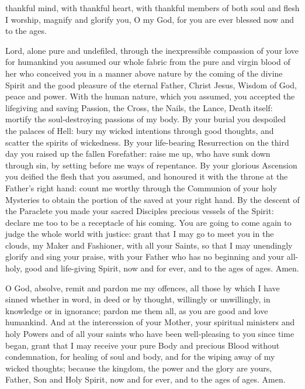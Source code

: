 thankful mind, with thankful heart, with thankful members of both soul and flesh I worship, magnify and glorify you, O my God, for you are ever blessed now and to the ages.


Lord, alone pure and undefiled, through the inexpressible compassion of your love for humankind you assumed our whole fabric from the pure and virgin blood of her who conceived you in a manner above nature by the coming of the divine Spirit and the good pleasure of the eternal Father, Christ Jesus, Wisdom of God, peace and power. With the human nature, which you assumed, you accepted the lifegiving and saving Passion, the Cross, the Nails, the Lance, Death itself: mortify the soul-destroying passions of my body. By your burial you despoiled the palaces of Hell: bury my wicked intentions through good thoughts, and scatter the spirits of wickedness. By your life-bearing Resurrection on the third day you raised up the fallen Forefather: raise me up, who have sunk down through sin, by setting before me ways of repentance. By your glorious Ascension you deified the flesh that you assumed, and honoured it with the throne at the Father's right hand: count me worthy through the Communion of your holy Mysteries to obtain the portion of the saved at your right hand. By the descent of the Paraclete you made your sacred Disciples precious vessels of the Spirit: declare me too to be a receptacle of his coming. You are going to come again to judge the whole world with justice: grant that I may go to meet you in the clouds, my Maker and Fashioner, with all your Saints, so that I may unendingly glorify and sing your praise, with your Father who has no beginning and your all-holy, good and life-giving Spirit, now and for ever, and to the ages of ages. Amen.


O God, absolve, remit and pardon me my offences, all those by which I have sinned whether in word, in deed or by thought, willingly or unwillingly, in knowledge or in ignorance; pardon me them all, as you are good and love humankind. And at the intercession of your Mother, your spiritual ministers and holy Powers and of all your saints who have been well-pleasing to you since time began, grant that I may receive your pure Body and precious Blood without condemnation, for healing of soul and body, and for the wiping away of my wicked thoughts; because the kingdom, the power and the glory are yours, Father, Son and Holy Spirit, now and for ever, and to the ages of ages. Amen.

